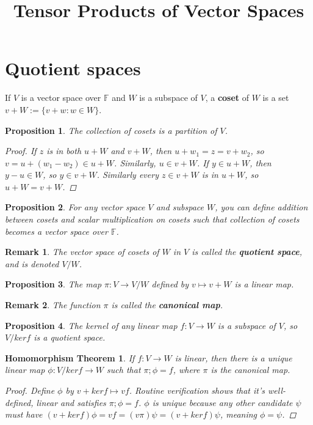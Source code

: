 \documentclass[a4paper,14pt]{article}
\title{Tensor Products of Vector Spaces}
\newtheorem*{prop}{Proposition}
\newtheorem*{remark}{Remark}
\newtheorem*{homomorphism-thm}{Homomorphism Theorem}
\begin{document}
\maketitle
\section{Quotient spaces}
If $V$ is a vector space over $\mathbb{F}$ and $W$ is a subspace of $V$, a \textbf{coset} of $W$ is a set $v + W := \{v + w : w \in W\}$. 

\begin{prop}
The collection of cosets is a partition of $V$.
\begin{proof}
If $z$ is in both $u + W$ and $v + W$, then $u + w_1 = z = v + w_2$, so $v = u + (w_1 - w_2) \in u + W$. Similarly, $u \in v + W$. If $y \in u + W$, then $y - u \in W$, so $y \in v + W$. Similarly every $z \in v + W$ is in $u + W$, so $u + W = v + W$.
\end{proof}
\end{prop}

\begin{prop}
For any vector space $V$ and subspace $W$, you can define addition between cosets and scalar multiplication on cosets such that collection of cosets becomes a vector space over $\mathbb{F}$.
\end{prop}

\begin{remark}
The vector space of cosets of $W$ in $V$ is called the \textbf{quotient space}, and is denoted $V/W$.
\end{remark}

\begin{prop}
The map $\pi: V \to V/W$ defined by $v \mapsto v + W$ is a linear map.
\end{prop}

\begin{remark}
The function $\pi$ is called the \textbf{canonical map}.
\end{remark}

\begin{prop}
The kernel of any linear map $f: V \to W$ is a subspace of $V$, so $V / ker f$ is a quotient space.
\end{prop}

\begin{homomorphism-thm}
If $f: V \to W$ is linear, then there is a unique linear map $\phi: V / ker f \to W$ such that $\pi ; \phi = f$, where $\pi$ is the canonical map.

\begin{proof}
    Define $\phi$ by $v + ker f \mapsto vf$. Routine verification shows that it's well-defined, linear and satisfies $\pi ; \phi = f$. $\phi$ is unique because any other candidate $\psi$ must have $(v + ker f)\phi = vf = (v \pi) \psi = (v + ker f) \psi$, meaning $\phi = \psi$.
\end{proof}
\end{homomorphism-thm}
\end{document}
